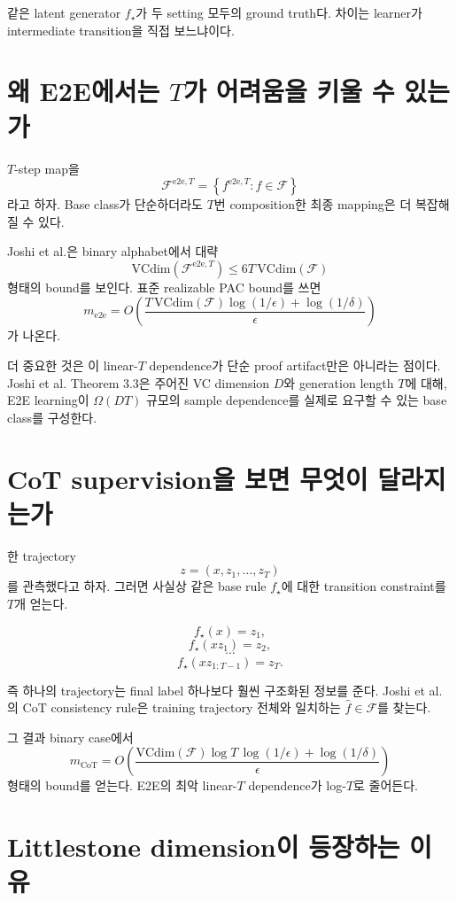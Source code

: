 \documentclass[11pt,a4paper,oneside,openany]{memoir}
\newcommand{\F}{\mathcal{F}}
\newcommand{\VC}{\mathrm{VCdim}}
\theoremstyle{definition}
\begin{document}
같은 latent generator $f_\star$가 두 setting 모두의 ground truth다.
차이는 learner가 intermediate transition을 직접 보느냐이다.

\section{왜 E2E에서는 \texorpdfstring{$T$}{T}가 어려움을 키울 수 있는가}

$T$-step map을
\[
\F^{\mathrm{e2e},T}
=\left\{f^{\mathrm{e2e},T}:f\in\F\right\}
\]
라고 하자.
Base class가 단순하더라도 $T$번 composition한 최종 mapping은 더 복잡해질 수 있다.

Joshi et al.은 binary alphabet에서 대략
\[
\VC\!\left(\F^{\mathrm{e2e},T}\right)
\le 6T\,\VC(\F)
\]
형태의 bound를 보인다.
표준 realizable PAC bound를 쓰면
\[
m_{\mathrm{e2e}}
=
O\!\left(
\frac{T\,\VC(\F)\log(1/\epsilon)+\log(1/\delta)}{\epsilon}
\right)
\]
가 나온다.

\begin{paperbox}
더 중요한 것은 이 linear-$T$ dependence가 단순 proof artifact만은 아니라는 점이다.
Joshi et al. Theorem 3.3은 주어진 VC dimension $D$와 generation length $T$에 대해, E2E learning이 $\Omega(DT)$ 규모의 sample dependence를 실제로 요구할 수 있는 base class를 구성한다.
\end{paperbox}

\section{CoT supervision을 보면 무엇이 달라지는가}

한 trajectory
\[
z=(x,z_1,\ldots,z_T)
\]
를 관측했다고 하자.
그러면 사실상 같은 base rule $f_\star$에 대한 transition constraint를 $T$개 얻는다.

\[
f_\star(x)=z_1,
\]
\[
f_\star(xz_1)=z_2,
\]
\[
\cdots
\]
\[
f_\star(xz_{1:T-1})=z_T.
\]

즉 하나의 trajectory는 final label 하나보다 훨씬 구조화된 정보를 준다.
Joshi et al.의 CoT consistency rule은 training trajectory 전체와 일치하는 $\hat f\in\F$를 찾는다.

그 결과 binary case에서
\[
m_{\mathrm{CoT}}
=
O\!\left(
\frac{
\VC(\F)\log T\,\log(1/\epsilon)
+
\log(1/\delta)
}{\epsilon}
\right)
\]
형태의 bound를 얻는다.
E2E의 최악 linear-$T$ dependence가 log-$T$로 줄어든다.

\section{Littlestone dimension이 등장하는 이유}
\end{document}
